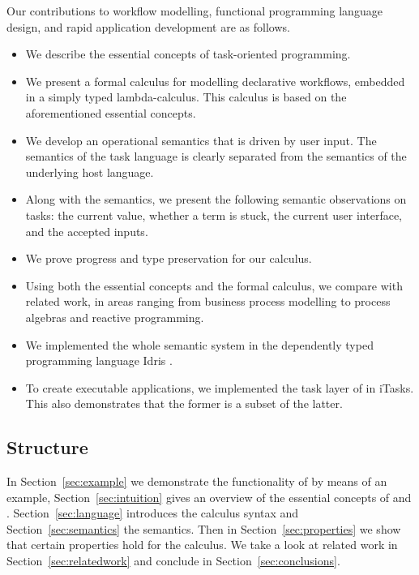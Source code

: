Our contributions to workflow modelling, functional programming language design, and rapid application development are as follows.


\begin{itemize}
  \item
    We describe the essential concepts of task-oriented programming.

  \item
    We present a formal calculus for modelling declarative workflows, embedded in a simply typed lambda-calculus.
    This calculus is based on the aforementioned essential \TOP concepts.

  \item
    We develop an operational semantics that is driven by user input.
    The semantics of the task language is clearly separated from the semantics of the underlying host language.

  \item
    Along with the semantics, we present the following semantic observations on tasks:
    the current value, whether a term is stuck, the current user interface, and the accepted inputs.

  \item
    We prove progress and type preservation for our calculus.

  \item
    Using both the essential concepts and the formal calculus, we compare \TOP with related work, in areas ranging from business process modelling to process algebras and reactive programming.

  \item
    We implemented the whole semantic system in the dependently typed programming language Idris \cite{journals/jfp/Brady13}.

  \item

    To create executable applications, we implemented the task layer of \TOPHAT in iTasks.
    This also demonstrates that the former is a subset of the latter.


\end{itemize}


\subsection{Structure}

In Section~\ref{sec:example} we demonstrate the functionality of \TOPHAT by means of an example,
Section~\ref{sec:intuition} gives an overview of the essential concepts of \TOP and \TOPHAT.
Section~\ref{sec:language} introduces the \TOPHAT calculus syntax
and Section~\ref{sec:semantics} the semantics.
Then in Section~\ref{sec:properties} we show that certain properties hold for the calculus.
We take a look at related work in Section~\ref{sec:relatedwork}
and conclude in Section~\ref{sec:conclusions}.
